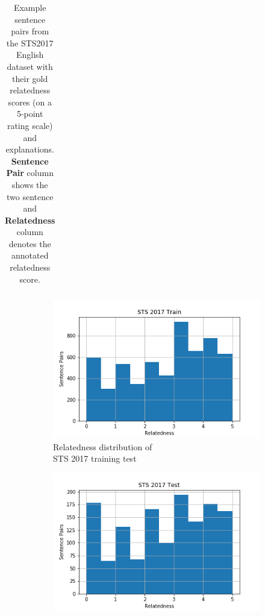 \begin{enumerate}
\begin{table}[ht!]
\begin{tabular}{l|c}
 	\end{tabular}
 	\caption[Example sentence pairs from the STS2017 English dataset]{Example sentence pairs from the STS2017 English dataset with their gold relatedness scores (on a 5-point rating scale) and explanations. \textbf{Sentence Pair} column shows the two sentence and \textbf{Relatedness} column denotes the annotated relatedness score.}
 	\label{tab:sts2017data}
 \end{table} 

\begin{figure}
	\captionsetup[subfigure]{justification=centering}
	\centering
	\begin{subfigure}[b]{.5\textwidth}
		\centering
		\includegraphics[width=\textwidth]{figures/semantic_textual_similarity/introduction/sts_train.png}
		\caption{Relatedness distribution of \\ STS 2017 training test}
		\label{fig:sts_train_relatedness}
	\end{subfigure}%
	\begin{subfigure}[b]{.5\textwidth}
		\centering
		\includegraphics[width=\textwidth]{figures/semantic_textual_similarity/introduction/sts_test.png}

\end{subfigure}
\end{figure}
\end{enumerate}
